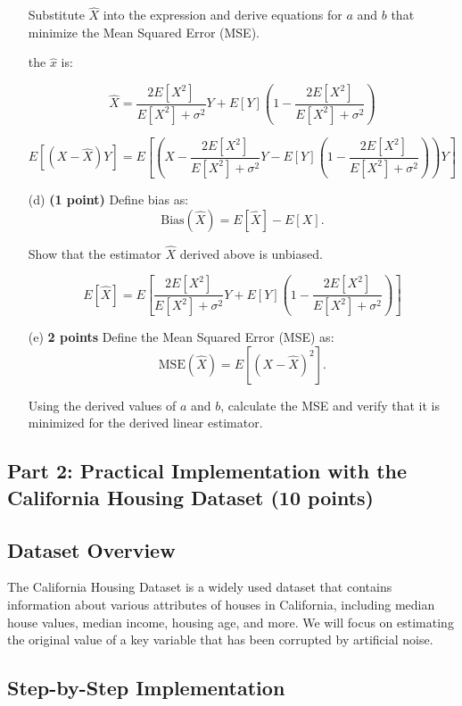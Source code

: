 \documentclass{article}
\begin{document}
\begin{enumerate}
    Substitute \( \hat{X} \) into the expression and derive equations for \( a \) and \( b \) that minimize the Mean Squared Error (MSE).

    the \( \hat{x}\) is:

    \[
    \hat{X} = \frac{2E[X^2]}{E[X^2] + \sigma^2}Y + E[Y](1 - \frac{2E[X^2]}{E[X^2] + \sigma^2})
    \]

    \[
    E[(X - \hat{X})Y] = E[(X - \frac{2E[X^2]}{E[X^2] + \sigma^2}Y - E[Y](1 - \frac{2E[X^2]}{E[X^2] + \sigma^2}))Y]
    \]


    \item[(d)] \textbf{(1 point)} Define bias as:
    \[
    \text{Bias}(\hat{X}) = E[\hat{X}] - E[X].
    \]


    
    Show that the estimator \( \hat{X} \) derived above is unbiased.

    \[
    E[\hat{X}] = E\left[\frac{2E[X^2]}{E[X^2] + \sigma^2}Y + E[Y](1 - \frac{2E[X^2]}{E[X^2] + \sigma^2})\right]
    \]

    \item[(e)] \textbf{2 points} Define the Mean Squared Error (MSE) as:
    \[
    \text{MSE}(\hat{X}) = E[(X - \hat{X})^2].
    \]
    
    Using the derived values of \( a \) and \( b \), calculate the MSE and verify that it is minimized for the derived linear estimator. 
\end{enumerate}

\subsection*{Part 2: Practical Implementation with the California Housing Dataset (10 points)}

\subsection*{Dataset Overview}
The California Housing Dataset is a widely used dataset that contains information about various attributes of houses in California, including median house values, median income, housing age, and more. We will focus on estimating the original value of a key variable that has been corrupted by artificial noise.

\subsection*{Step-by-Step Implementation}
\end{document}

